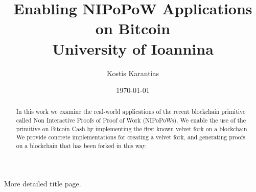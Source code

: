 \documentclass{report}
\begin{document}
\begin{titlepage}
  \title{
    {Enabling NIPoPoW Applications on Bitcoin} \\
  {\large University of Ioannina} \\
  }
  \author{Kostis Karantias}
  \date{\today}
  \maketitle
\end{titlepage}

\newpage

\thispagestyle{empty}
\null

\newpage

More detailed title page.
\thispagestyle{empty}

\newpage

\thispagestyle{empty}
\null

\newpage

\begin{abstract}
  In this work we examine the real-world applications of the recent blockchain primitive called Non Interactive Proofs of Proof of Work (NIPoPoWs). We enable the use of the primitive on Bitcoin Cash by implementing the first known velvet fork on a blockchain. We provide concrete implementations for creating a velvet fork, and generating proofs on a blockchain that has been forked in this way.
\end{abstract}

\newpage

\tableofcontents

\newpage








\end{document}
